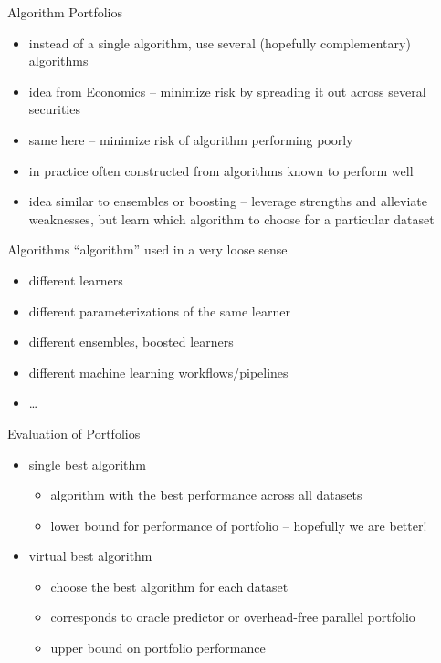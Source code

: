 \begin{frame}[c]{Algorithm Portfolios}
\begin{itemize}
    \item instead of a single algorithm, use several (hopefully complementary) algorithms
\item idea from Economics -- minimize risk by spreading it out across several
    securities
\item same here -- minimize risk of algorithm performing poorly
\item in practice often constructed from algorithms known to perform well
\item idea similar to ensembles or boosting -- leverage strengths and alleviate
    weaknesses, but learn which algorithm to choose for a particular dataset
\end{itemize}
\end{frame}

\begin{frame}[c]{Algorithms}
``algorithm'' used in a very loose sense
\begin{itemize}
\item different learners
\item different parameterizations of the same learner
\item different ensembles, boosted learners
\item different machine learning workflows/pipelines
\item \ldots
\end{itemize}
\end{frame}

\begin{frame}[c]{Evaluation of Portfolios}
\begin{itemize}
\item single best algorithm
    \begin{itemize}
    \item algorithm with the best performance across all datasets
    \item lower bound for performance of portfolio -- hopefully we are better!
    \end{itemize}
\item virtual best algorithm
    \begin{itemize}
    \item choose the best algorithm for each dataset
    \item corresponds to oracle predictor or overhead-free parallel portfolio
    \item upper bound on portfolio performance
    \end{itemize}
\end{itemize}
\end{frame}


